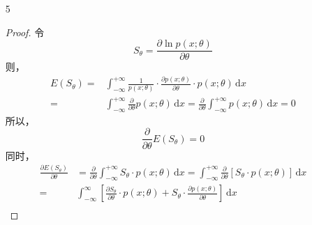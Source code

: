 \documentclass[normal,founder,mtpro2,cn]{elegantnote}
\begin{document}
\begin{enumerate}
\begin{proof}
\begin{equation*}
                \operatorname{Cov}\left(T,T-\hat{g}\right)=\operatorname{Var}\left(T\right)-\operatorname{Cov}\left(T,\hat{g}\right)=0
            \end{equation*}
            故，
            \begin{equation*}
                \operatorname{Cov}\left(T,\hat{g}\right)=\operatorname{Var}\left(T\right)\geq 0
            \end{equation*}
        \end{proof}
    \item[5]
        \begin{proof}
            令
            \begin{equation*}
                S_{\theta}=\frac{\partial\ln p\left(x;\theta\right)}{\partial\theta}
            \end{equation*}
            则，
            \begin{equation*}
                \begin{aligned}
                    E\left(S_{\theta}\right)= & \int_{-\infty}^{+\infty}\frac{1}{p\left(x;\theta\right)}\cdot\frac{\partial p\left(x;\theta\right)}{\partial\theta}\cdot p\left(x;\theta\right)\,\mathrm{d}x                            \\
                    =                         & \int_{-\infty}^{+\infty}\frac{\partial}{\partial\theta}p\left(x;\theta\right)\,\mathrm{d}x=\frac{\partial}{\partial\theta}\int_{-\infty}^{+\infty}p\left(x;\theta\right)\,\mathrm{d}x=0
                \end{aligned}
            \end{equation*}
            所以，
            \begin{equation*}
                \frac{\partial}{\partial\theta}E\left(S_{\theta}\right)=0
            \end{equation*}
            同时，
            \begin{equation*}
                \begin{aligned}
                    \frac{\partial E\left(S_{\theta}\right)}{\partial\theta} & =\frac{\partial}{\partial\theta} \int_{-\infty}^{+\infty}S_{\theta}\cdot p\left(x;\theta\right)\,\mathrm{d}x=\int_{-\infty}^{+\infty}\frac{\partial}{\partial\theta}\left[S_{\theta}\cdot p\left(x;\theta\right)\right]\,\mathrm{d}x                                           \\
                    =                                                        & \int_{-\infty}^{\infty}\left[\frac{\partial S_{\theta}}{\partial\theta}\cdot p\left(x;\theta\right)+S_{\theta}\cdot\frac{\partial p\left(x;\theta\right)}{\partial\theta}\right]\,\mathrm{d}x                                                                                  \\

\end{aligned}
\end{equation*}
\end{proof}
\end{enumerate}
\end{document}
